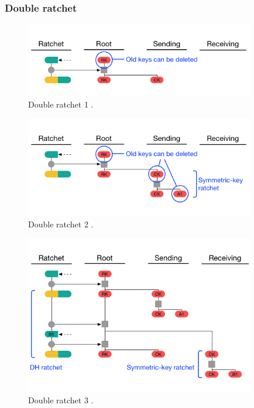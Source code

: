 \subsubsection{Double ratchet}
\begin{figure}[H]
	\centering
	\includegraphics[width=10cm]{figures/doubleratchet1.png}
	\caption{Double ratchet 1 \cite{doubleratchet}.}
	\label{fig:doubleratchet1}
\end{figure}

\begin{figure}[H]
	\centering
	\includegraphics[width=10cm]{figures/doubleratchet2.png}
	\caption{Double ratchet 2 \cite{doubleratchet}.}
	\label{fig:doubleratchet2}
\end{figure}

\begin{figure}[H]
	\centering
	\includegraphics[width=10cm]{figures/doubleratchet3.png}
	\caption{Double ratchet 3 \cite{doubleratchet}.}
	\label{fig:doubleratchet3}
\end{figure}

